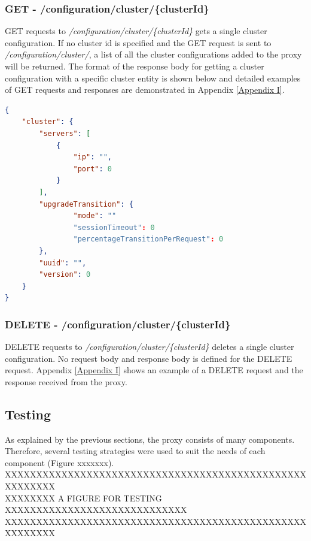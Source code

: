 \documentclass[a4paper,11pt,twoside]{article}
\begin{document}
\subsubsection{GET - /configuration/cluster/\{clusterId\}} 
GET requests to \textit{/configuration/cluster/\{clusterId\}} gets a single cluster configuration. If no cluster id is specified and the GET request is sent to \textit{/configuration/cluster/}, a list of all the cluster configurations added to the proxy will be returned. The format of the response body for getting a cluster configuration with a specific cluster entity is shown below and detailed examples of GET requests and responses are demonstrated in Appendix \ref{Appendix  I}.\\

\begin{lstlisting}[language=json,firstnumber=1]
{
    "cluster": {
        "servers": [
            {
                "ip": "",
                "port": 0
            }
        ],
        "upgradeTransition": {
                "mode": ""
                "sessionTimeout": 0  
                "percentageTransitionPerRequest": 0  
        },
        "uuid": "",
        "version": 0
    }
}

\end{lstlisting}

\subsubsection{DELETE - /configuration/cluster/\{clusterId\}}
DELETE requests to \textit{/configuration/cluster/\{clusterId\}} deletes a single cluster configuration. No request body and response body is defined for the DELETE request. Appendix \ref{Appendix I} shows an example of a DELETE request and the response received from the proxy.

\subsection{Testing}
As explained by the previous sections, the proxy consists of many components. Therefore, several testing strategies were used to suit the needs of each component (Figure xxxxxxx).\\

XXXXXXXXXXXXXXXXXXXXXXXXXXXXXXXXXXXXXXXXXXXXXXXXXXXXXXXX\\
XXXXXXXX A FIGURE FOR TESTING XXXXXXXXXXXXXXXXXXXXXXXXXXXXX\\
XXXXXXXXXXXXXXXXXXXXXXXXXXXXXXXXXXXXXXXXXXXXXXXXXXXXXXXX\\ 
\end{document}

